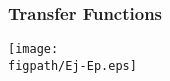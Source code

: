 \begin{comment}
			\hline\hline\\[-2.7ex]
			& XS & Luminosity (\pbinv) & $\frac{\#\text{ events in pfIso }>0.3\text{ region}}{\#\text{ events in signal region}}$ & \# events expected in pfIso $>0.3$ region\\
			\hline\\[-2.7ex]
			WJets & 37509.0 & 19148 & $\frac{214}{72162}\approx0.00297$ & 6488.8\\
			\hline\\[-2.7ex]
			Total Background & 41440.805 & 19148 & $\frac{214}{72162}\approx0.00297$ & \textbf{7169.0}\\
			\hline\\[-2.7ex]
			QCD (data-driven) & N/A & 19148 & $\frac{656968}{3313619}\approx0.198$ & \textbf{656968.0}\\
			\hline
		\end{tabular}
		\label{tab:QCDPurity}
	\end{table}
	\begin{center}
		\textbf{\emph{1.09\% of the events in the QCD region come from non-QCD events}}
	\end{center}
}
\end{comment}

\begin{frame}
	\frametitle{Transfer Functions}
	\vspace*{-0.24cm}
	\begin{center}
		\texttt{[image: \\figpath/Ej-Ep.eps]}
	\end{center}
\end{frame}

